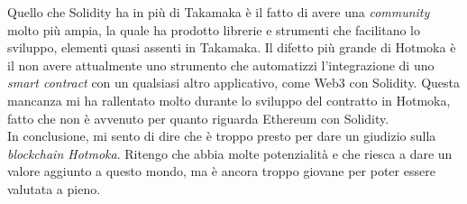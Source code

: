 Quello che Solidity ha in più di Takamaka è il fatto di avere una \textit{community} molto più ampia, la quale ha prodotto librerie e strumenti che facilitano lo sviluppo, elementi quasi assenti in Takamaka. Il difetto più grande di Hotmoka è il non avere attualmente uno strumento che automatizzi l'integrazione di uno \textit{smart contract} con un qualsiasi altro applicativo, come Web3 con Solidity. Questa mancanza mi ha rallentato molto durante lo sviluppo del contratto in Hotmoka, fatto che non è avvenuto per quanto riguarda Ethereum con Solidity. \\

In conclusione, mi sento di dire che è troppo presto per dare un giudizio sulla \textit{blockchain Hotmoka}. Ritengo che abbia molte potenzialità e che riesca a dare un valore aggiunto a questo mondo, ma è ancora troppo giovane per poter essere valutata a pieno. 
